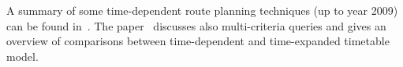 	\hspace{\fill}
	
	\noindent A summary of some time-dependent route planning techniques (up to year 2009) can be found in~\cite{tdroute09}. The paper~\cite{timetablemodelsalgs07} discusses also multi-criteria queries and gives an overview of comparisons between time-dependent and time-expanded timetable model. 